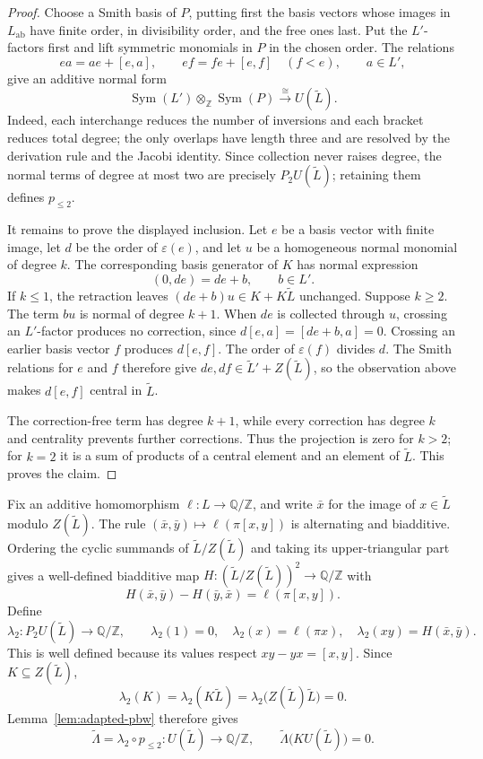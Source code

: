 \documentclass[a4paper,11pt,reqno]{amsart}
\newcommand{\Z}{\mathbb Z}
\newcommand{\Q}{\mathbb Q}
\newcommand{\D}{\Q/\Z}
\newcommand{\Sym}{\operatorname{Sym}}
\begin{document}
\begin{proof}
Choose a Smith basis of $P$, putting first the basis vectors whose
images in $L_{\mathrm{ab}}$ have finite order, in divisibility order,
and the free ones last.  Put the $L'$-factors first and lift symmetric
monomials in $P$ in the chosen order.  The relations
\[
 ea=ae+[e,a],\qquad ef=fe+[e,f]\quad(f<e),
 \qquad a\in L',
\]
give an additive normal form
\[
 \Sym(L')\otimes_\Z\Sym(P)\xrightarrow{\ \cong\ }U(\widetilde L).
\]
Indeed, each interchange reduces the number of inversions and each
bracket reduces total degree; the only overlaps have length three and
are resolved by the derivation rule and the Jacobi identity.  Since
collection never raises degree, the normal terms of degree at most two
are precisely $P_2U(\widetilde L)$; retaining them defines $p_{\leq2}$.

It remains to prove the displayed inclusion.  Let $e$ be a basis
vector with finite image, let $d$ be the order of $\varepsilon(e)$,
and let $u$ be a homogeneous normal monomial of degree $k$.  The
corresponding basis generator of $K$ has normal expression
\[
                         (0,de)=de+b,\qquad b\in L'.
\]
If $k\leq1$, the retraction leaves $(de+b)u\in K+K\widetilde L$
unchanged.  Suppose $k\geq2$.  The term $bu$ is normal of degree
$k+1$.  When $de$ is collected through $u$, crossing an $L'$-factor
produces no correction, since $d[e,a]=[de+b,a]=0$.  Crossing an
earlier basis vector $f$ produces $d[e,f]$.  The order of
$\varepsilon(f)$ divides $d$.  The Smith relations for $e$ and $f$
therefore give
$de,df\in\widetilde L'+Z(\widetilde L)$, so the observation above
makes $d[e,f]$ central in $\widetilde L$.

The correction-free term has degree $k+1$, while every correction has
degree $k$ and centrality prevents further corrections.  Thus the
projection is zero for $k>2$; for $k=2$ it is a sum of products of a
central element and an element of $\widetilde L$.  This proves the
claim.
\end{proof}

Fix an additive homomorphism $\ell:L\to\D$, and write $\bar x$ for the
image of $x\in\widetilde L$ modulo $Z(\widetilde L)$.  The rule
$(\bar x,\bar y)\mapsto\ell(\pi[x,y])$ is alternating and biadditive.
Ordering the cyclic summands of $\widetilde L/Z(\widetilde L)$ and
taking its upper-triangular part gives a well-defined biadditive map
$H:(\widetilde L/Z(\widetilde L))^2\to\D$ with
\[
 H(\bar x,\bar y)-H(\bar y,\bar x)=\ell(\pi[x,y]).
\]
Define
\[
 \lambda_2:P_2U(\widetilde L)\longrightarrow\D,
 \qquad
 \lambda_2(1)=0,
 \quad \lambda_2(x)=\ell(\pi x),
 \quad \lambda_2(xy)=H(\bar x,\bar y).
\]
This is well defined because its values respect $xy-yx=[x,y]$.
Since $K\subseteq Z(\widetilde L)$,
\[
 \lambda_2(K)=\lambda_2(K\widetilde L)
 =\lambda_2\bigl(Z(\widetilde L)\widetilde L\bigr)=0.
\]
Lemma~\ref{lem:adapted-pbw} therefore gives
\[
 \widetilde\Lambda=\lambda_2\circ p_{\leq2}:
 U(\widetilde L)\longrightarrow\D,
 \qquad
 \widetilde\Lambda\bigl(KU(\widetilde L)\bigr)=0.
\]
\end{document}
